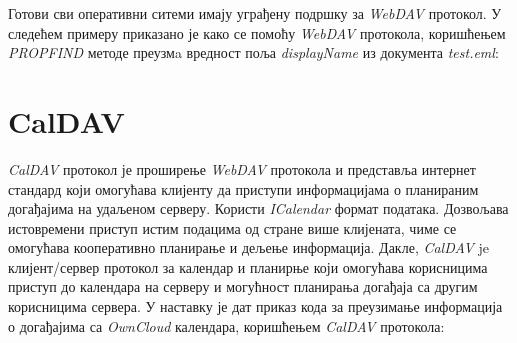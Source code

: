 Готови сви оперативни ситеми имају уграђену подршку за \textit{WebDAV} протокол. У следећем примеру приказано је како се помоћу \textit{WebDAV} протокола, коришћењем \textit{PROPFIND} методе преузмa вредност поља \textit{displayName} из документа \textit{test.eml}:


\section {CalDAV}

\textit{CalDAV} протокол је проширење \textit{WebDAV} протокола и представља  интернет стандард који омогућава клијенту да приступи информацијама о планираним догађајима на удаљеном серверу. Користи \textit{ICalendar}\cite{ical} формат података. Дозвољава истовремени приступ истим подацима од стране више клијената, чиме се омогућава кооперативно планирање и дељење информација. Дакле, \textit{CalDAV} je клијент/сервер протокол за календар и планирње који омогућава корисницима приступ до календара на серверу и могућност планирања догађаја са другим корисницима сервера. У наставку је дат приказ кода за преузимање информација о догађајима са \textit{OwnCloud} календара, коришћењем \textit{CalDAV} протокола:
\newpage
